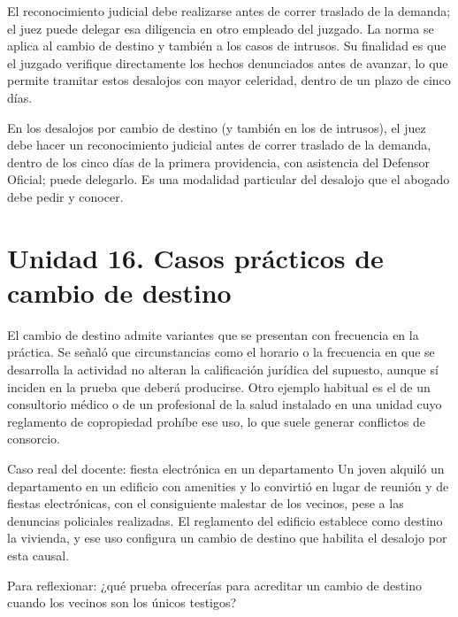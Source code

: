 \documentclass[12pt,oneside]{book}
\begin{document}
El reconocimiento judicial debe realizarse antes de correr traslado de la demanda; el juez puede delegar esa diligencia en otro empleado del juzgado. La norma se aplica al cambio de destino y también a los casos de intrusos. Su finalidad es que el juzgado verifique directamente los hechos denunciados antes de avanzar, lo que permite tramitar estos desalojos con mayor celeridad, dentro de un plazo de cinco días.

\begin{important}
En los desalojos por cambio de destino (y también en los de intrusos), el juez debe hacer un reconocimiento judicial antes de correr traslado de la demanda, dentro de los cinco días de la primera providencia, con asistencia del Defensor Oficial; puede delegarlo. Es una modalidad particular del desalojo que el abogado debe pedir y conocer.
\end{important}

\section*{Unidad 16. Casos prácticos de cambio de destino}

El cambio de destino admite variantes que se presentan con frecuencia en la práctica. Se señaló que circunstancias como el horario o la frecuencia en que se desarrolla la actividad no alteran la calificación jurídica del supuesto, aunque sí inciden en la prueba que deberá producirse. Otro ejemplo habitual es el de un consultorio médico o de un profesional de la salud instalado en una unidad cuyo reglamento de copropiedad prohíbe ese uso, lo que suele generar conflictos de consorcio.

\begin{example}{Caso real del docente: fiesta electrónica en un departamento}
Un joven alquiló un departamento en un edificio con amenities y lo convirtió en lugar de reunión y de fiestas electrónicas, con el consiguiente malestar de los vecinos, pese a las denuncias policiales realizadas. El reglamento del edificio establece como destino la vivienda, y ese uso configura un cambio de destino que habilita el desalojo por esta causal.
\end{example}

\begin{note}
Para reflexionar: ¿qué prueba ofrecerías para acreditar un cambio de destino cuando los vecinos son los únicos testigos?
\end{note}
\end{document}
